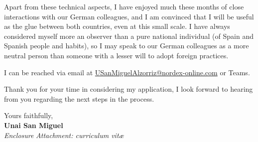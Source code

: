 \documentclass[11pt]{article}
\begin{document}
Apart from these technical aspects, I have enjoyed much these months of close interactions with our German colleagues, and I am convinced that I will be useful as the glue between both countries, even at this small scale. I have always considered myself more an observer than a pure national individual (of Spain and Spanish people and habits), so I may speak to our German colleagues as a more neutral person than someone with a lesser will to adopt foreign practices.

I can be reached via email at \href{mailto:USanMiguelAlzorriz@nordex-online.com}{USanMiguelAlzorriz@nordex-online.com} or Teams.

Thank you for your time in considering my application, I look forward to hearing from you regarding the next steps in the process.

Yours faithfully,\\[2em] %
%
{\bfseries Unai San Miguel}\\
%
\vfill%
{\slshape Enclosure}
{\slshape Attachment: curriculum vit\ae{}}
\end{document}
